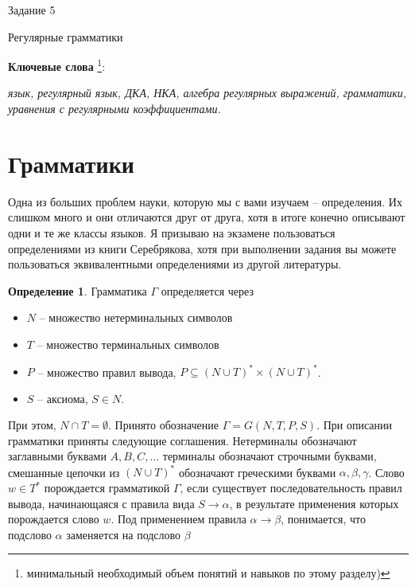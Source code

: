 \documentclass[12pt]{article}
\theoremstyle{definiton}
\theoremstyle{definition}
\theoremstyle{definition}
\newtheorem{Def}{Определение}
\let\es\emptyset
\begin{document}
\centerline{\LARGE Задание 5}

\medskip

\begin{center}
	{\Large Регулярные грамматики}
\end{center}

\bigskip



{\bf Ключевые слова }\footnote{минимальный необходимый объем понятий и навыков по
этому разделу)}:{\em  язык, регулярный язык, ДКА, НКА,
алгебра регулярных выражений,  грамматики, уравнения с регулярными коэффициентами. %

}


\section{Грамматики}

Одна из больших проблем науки, которую мы с вами изучаем -- определения. Их слишком много и они отличаются друг от друга, хотя в итоге конечно описывают одни и те же классы языков. Я призываю на экзамене пользоваться определениями из книги Серебрякова, хотя при выполнении задания вы можете пользоваться эквивалентными определениями из другой литературы.

\begin{Def}
	Грамматика $\Gamma$ определяется через
	\begin{itemize}
		\item $N$ -- множество нетерминальных символов
		\item $T$ -- множество терминальных символов
		\item $P$ -- множество правил вывода, $P \subseteq (N\cup T)^* \times (N\cup T)^*$.
		\item $S$ -- аксиома, $S \in N$.
	\end{itemize}
	При этом, $N\cap T = \es$. Принято обозначение $\Gamma = G(N, T, P, S)$.
	При описании грамматики приняты следующие соглашения. Нетерминалы обозначают заглавными буквами $A, B, C,\ldots$ терминалы обозначают строчными буквами, смешанные цепочки из $(N\cup T)^*$ обозначают греческими буквами $\alpha, \beta, \gamma$. Слово $w \in T^*$ порождается грамматикой $\Gamma$, если существует последовательность правил вывода, начинающаяся с правила вида $S \to \alpha$, в результате применения которых порождается слово $w$. Под применением правила $\alpha \to \beta$, понимается, что подслово $\alpha$ заменяется на подслово $\beta$
\end{Def}
\end{document}
